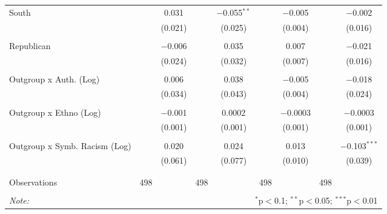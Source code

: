 \begin{table}[H]
{\begin{tabular}{@{\extracolsep{5pt}}lcccccccc}
 South &  & 0.031 &  & $-$0.055$^{**}$ &  & $-$0.005 &  & $-$0.002 \\ 
  &  & (0.021) &  & (0.025) &  & (0.004) &  & (0.016) \\ 
  & & & & & & & & \\ 
 Republican &  & $-$0.006 &  & 0.035 &  & 0.007 &  & $-$0.021 \\ 
  &  & (0.024) &  & (0.032) &  & (0.007) &  & (0.016) \\ 
  & & & & & & & & \\ 
 Outgroup x Auth. (Log) &  & 0.006 &  & 0.038 &  & $-$0.005 &  & $-$0.018 \\ 
  &  & (0.034) &  & (0.043) &  & (0.004) &  & (0.024) \\ 
  & & & & & & & & \\ 
 Outgroup x Ethno (Log) &  & $-$0.001 &  & 0.0002 &  & $-$0.0003 &  & $-$0.0003 \\ 
  &  & (0.001) &  & (0.001) &  & (0.001) &  & (0.001) \\ 
  & & & & & & & & \\ 
 Outgroup x Symb. Racism (Log) &  & 0.020 &  & 0.024 &  & 0.013 &  & $-$0.103$^{***}$ \\ 
  &  & (0.061) &  & (0.077) &  & (0.010) &  & (0.039) \\ 
  & & & & & & & & \\ 
\hline \\[-1.8ex] 
Observations & 498 &  & 498 &  & 498 &  & 498 &  \\ 
\hline 
\hline \\[-1.8ex] 
\textit{Note:}  & \multicolumn{8}{r}{$^{*}$p$<$0.1; $^{**}$p$<$0.05; $^{***}$p$<$0.01} \\ 
\end{tabular}} 
\end{table} 
